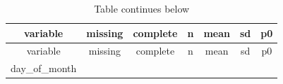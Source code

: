 \documentclass[]{book}
\theoremstyle{definition}
\theoremstyle{definition}
\theoremstyle{definition}
\theoremstyle{remark}
\begin{document}
\begin{longtable}[]{@{}ccccccc@{}}
\caption{Table continues below}\tabularnewline
\toprule
\begin{minipage}[b]{0.17\columnwidth}\centering\strut
variable\strut
\end{minipage} & \begin{minipage}[b]{0.11\columnwidth}\centering\strut
missing\strut
\end{minipage} & \begin{minipage}[b]{0.12\columnwidth}\centering\strut
complete\strut
\end{minipage} & \begin{minipage}[b]{0.10\columnwidth}\centering\strut
n\strut
\end{minipage} & \begin{minipage}[b]{0.11\columnwidth}\centering\strut
mean\strut
\end{minipage} & \begin{minipage}[b]{0.09\columnwidth}\centering\strut
sd\strut
\end{minipage} & \begin{minipage}[b]{0.10\columnwidth}\centering\strut
p0\strut
\end{minipage}\tabularnewline
\midrule
\endfirsthead
\toprule
\begin{minipage}[b]{0.17\columnwidth}\centering\strut
variable\strut
\end{minipage} & \begin{minipage}[b]{0.11\columnwidth}\centering\strut
missing\strut
\end{minipage} & \begin{minipage}[b]{0.12\columnwidth}\centering\strut
complete\strut
\end{minipage} & \begin{minipage}[b]{0.10\columnwidth}\centering\strut
n\strut
\end{minipage} & \begin{minipage}[b]{0.11\columnwidth}\centering\strut
mean\strut
\end{minipage} & \begin{minipage}[b]{0.09\columnwidth}\centering\strut
sd\strut
\end{minipage} & \begin{minipage}[b]{0.10\columnwidth}\centering\strut
p0\strut
\end{minipage}\tabularnewline
\midrule
\endhead
\begin{minipage}[t]{0.17\columnwidth}\centering\strut
day\_of\_month\strut
\end{minipage} & \begin{minipage}[t]{0.11\columnwidth}\centering\strut

\end{minipage}
\end{longtable}
\end{document}
